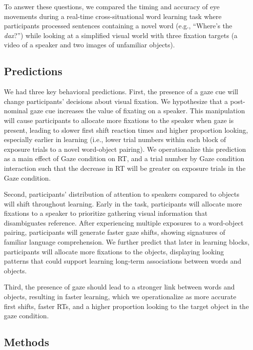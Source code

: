 \documentclass[man,floatsintext]{apa6}
\begin{document}
To answer these questions, we compared the timing and accuracy of eye
movements during a real-time cross-situational word learning task where
participants processed sentences containing a novel word (e.g.,
\enquote{Where's the \emph{dax}?}) while looking at a simplified visual
world with three fixation targets (a video of a speaker and two images
of unfamiliar objects).

\subsection{Predictions}\label{predictions}

We had three key behavioral predictions. First, the presence of a gaze
cue will change participants' decisions about visual fixation. We
hypothesize that a post-nominal gaze cue increases the value of fixating
on a speaker. This manipulation will cause participants to allocate more
fixations to the speaker when gaze is present, leading to slower first
shift reaction times and higher proportion looking, especially earlier
in learning (i.e., lower trial numbers within each block of exposure
trials to a novel word-object pairing). We operationalize this
prediction as a main effect of Gaze condition on RT, and a trial number
by Gaze condition interaction such that the decrease in RT will be
greater on exposure trials in the Gaze condition.

Second, participants' distribution of attention to speakers compared to
objects will shift throughout learning. Early in the task, participants
will allocate more fixations to a speaker to prioritize gathering visual
information that disambiguates reference. After experiencing multiple
exposures to a word-object pairing, participants will generate faster
gaze shifts, showing signatures of familiar language comprehension. We
further predict that later in learning blocks, participants will
allocate more fixations to the objects, displaying looking patterns that
could support learning long-term associations between words and objects.

Third, the presence of gaze should lead to a stronger link between words
and objects, resulting in faster learning, which we operationalize as
more accurate first shifts, faster RTs, and a higher proportion looking
to the target object in the gaze condition.

\subsection{Methods}\label{methods-2}
\end{document}
